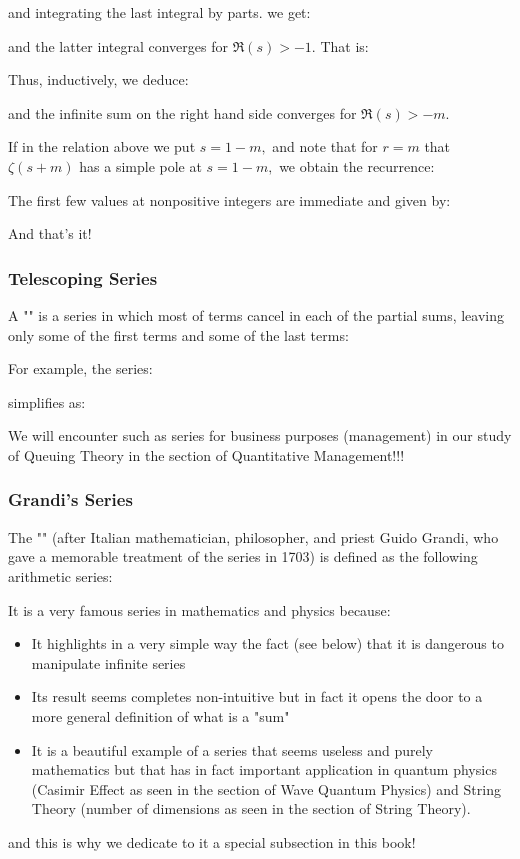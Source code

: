 \begin{itemize}
		and integrating the last integral by parts. we get:
		
		and the latter integral converges for $\Re(s)>-1$. That is:
		
		Thus, inductively, we deduce:
		
		and the infinite sum on the right hand side converges for $\Re(s)>-m$. 
		
		If in the relation above we put $s=1-m,$ and note that for $r=m$ that $\zeta(s+m)$ has a simple pole at $s=1-m,$ we obtain the recurrence:
		
		The first few values at nonpositive integers are immediate and given by:
		
		And that's it!
	\end{itemize}
		
	\subsubsection{Telescoping Series}
	A "" is a series in which most of terms cancel in each of the partial sums, leaving only some of the first terms and some of the last terms:
	
	For example, the series:
	
	simplifies as:
	
	We will encounter such as series for business purposes (management) in our study of Queuing Theory in the section of Quantitative Management!!!
	
	\subsubsection{Grandi's Series}\label{Grandi series}
	The "" (after Italian mathematician, philosopher, and priest Guido Grandi, who gave a memorable treatment of the series in 1703) is defined as the following arithmetic series:
	
	It is a very famous series in mathematics and physics because:
	\begin{itemize}
		\item It highlights in a very simple way the fact (see below) that it is dangerous to manipulate infinite series
		
		\item Its result seems completes non-intuitive but in fact it opens the door to a more general definition of what is a "sum"
		
		\item It is a beautiful example of a series that seems useless and purely mathematics but that has in fact important application in quantum physics (Casimir Effect as seen in the section of Wave Quantum Physics) and String Theory (number of dimensions as seen in the section of String Theory).
	\end{itemize}
	and this is why we dedicate to it a special subsection in this book!
	
